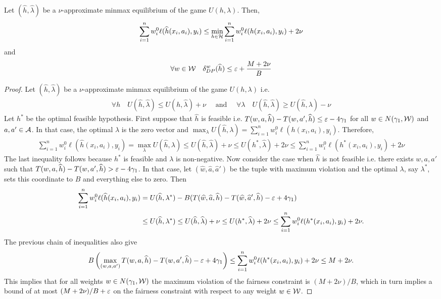 \begin{lemma}\label{lem:minmax-to-soln}
Let $(\hat{h},\hat{\lambda})$ be a $\nu$-approximate minmax equilibrium of the game $U(h,\lambda)$. Then,
$$\sum_{i=1}^n w^0_i \ell(\widehat{h}(x_i,a_i),y_i) \le \min_{h \in \mathcal{H}}\sum_{i=1}^n w^0_i \ell({h}(x_i,a_i),y_i) + 2\nu$$
and 
$$\forall w \in \mathcal{W}\quad \delta^w_{DP}(\widehat{h}) \le \varepsilon + \frac{M + 2\nu}{B}$$
\end{lemma}
\begin{proof}
Let $(\hat{h},\hat{\lambda})$ be a $\nu$-approximate minmax equilibrium of the game $U(h,\lambda)$ i.e. 
\begin{align*}
 \forall h \quad  U(\hat{h},\hat{\lambda}) \le U(h,\hat{\lambda}) + \nu  \quad \text{ and } \quad \forall \lambda  \quad U(\hat{h},\hat{\lambda}) \ge U(\hat{h}, \lambda) - \nu
\end{align*}
Let $h^*$ be the optimal feasible hypothesis. First suppose that $\hat{h}$ is feasible i.e. $T(w,a,\widehat{h}) - T(w,a',\widehat{h}) \le \varepsilon - 4\gamma_1$ for all $w \in N(\gamma_1,\mathcal{W})$ and $a,a' \in \mathcal{A}$. In that case, the optimal $\lambda$ is the zero vector and $\max_{\lambda} U(\hat{h},\lambda) = \sum_{i=1}^n w^0_i \ell(h(x_i,a_i),y_i)$. Therefore,
\begin{align*}
\sum_{i=1}^n w^0_i \ell(\hat{h}(x_i,a_i),y_i) = \max_{\lambda} U(\hat{h},\lambda) \le U(\hat{h},\hat{\lambda}) + \nu \le U(h^*,\hat{\lambda}) + 2\nu \le \sum_{i=1}^n w^0_i \ell(h^*(x_i,a_i),y_i) + 2\nu
\end{align*}
The last inequality follows because $h^*$ is feasible and $\lambda$ is non-negative. Now consider the case when $\hat{h}$ is not feasible i.e. there exists $w,a,a'$ such that $T(w,a,\widehat{h}) - T(w,a',\widehat{h}) > \varepsilon - 4\gamma_1$. In that case, let $(\hat{w},\hat{a},\hat{a}')$ be the tuple with maximum violation and the optimal $\lambda$, say $\lambda^*$, sets this coordinate to $B$ and everything else to zero. Then
\begin{align*}
\sum_{i=1}^n w^0_i \ell(\widehat{h}(x_i,a_i),y_i) &= U(\widehat{h},\lambda^*) - B(T(\widehat{w},\widehat{a},\widehat{h}) - T(\widehat{w},\widehat{a}',\widehat{h}) - \varepsilon + 4\gamma_1)\\
 &\le U(\widehat{h},\lambda^*) \le U(\widehat{h},\widehat{\lambda}) + \nu \le U(h^*,\widehat{\lambda}) + 2\nu \le \sum_{i=1}^n w^0_i \ell(h^*(x_i,a_i),y_i) + 2\nu.
\end{align*}
The previous chain of inequalities also give 
\begin{align*}
B \left( \max_{(w,a,a')}T(w,a,\widehat{h}) - T(w,a',\widehat{h}) -\varepsilon + 4\gamma_1 \right)\le \sum_{i=1}^n w^0_i \ell(h^*(x_i,a_i),y_i) + 2\nu \le M + 2\nu.
\end{align*}
This implies that for all weights $w \in N(\gamma_1,\mathcal{W})$ the maximum violation of the fairness constraint is $(M + 2\nu)/ B$, which in turn implies a bound of at most $(M + 2\nu)/B + \varepsilon$ on the fairness constraint with respect to any weight $w \in \mathcal{W}$. 
\end{proof}